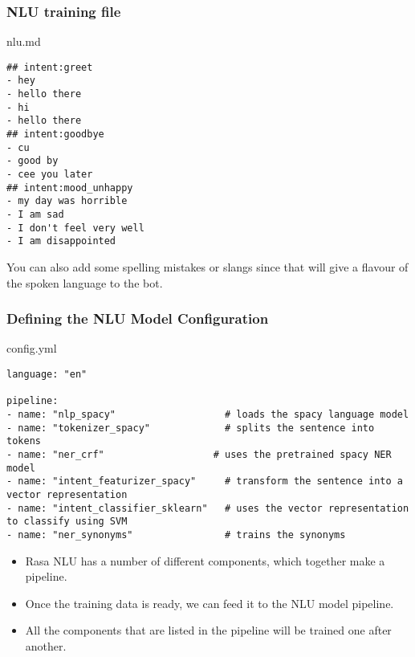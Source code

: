  \begin{frame}[fragile]\frametitle{NLU training file}
 nlu.md

\begin{lstlisting}
## intent:greet
- hey
- hello there
- hi
- hello there
## intent:goodbye
- cu
- good by
- cee you later
## intent:mood_unhappy
- my day was horrible
- I am sad
- I don't feel very well
- I am disappointed
\end{lstlisting}

You can also add some spelling mistakes or slangs since that will give a flavour of the spoken language to the bot.

\end{frame}

 \begin{frame}[fragile]\frametitle{Defining the NLU Model Configuration}
config.yml

\begin{lstlisting}
language: "en"

pipeline:
- name: "nlp_spacy"                   # loads the spacy language model
- name: "tokenizer_spacy"             # splits the sentence into tokens
- name: "ner_crf"                   # uses the pretrained spacy NER model
- name: "intent_featurizer_spacy"     # transform the sentence into a vector representation
- name: "intent_classifier_sklearn"   # uses the vector representation to classify using SVM
- name: "ner_synonyms"                # trains the synonyms
\end{lstlisting}

\begin{itemize}
\item Rasa NLU has a number of different components, which together make a pipeline. 
\item Once the training data is ready, we can feed it to the NLU model pipeline. 
\item All the components that are listed in the pipeline will be trained one after another.
\end{itemize}

\end{frame}

